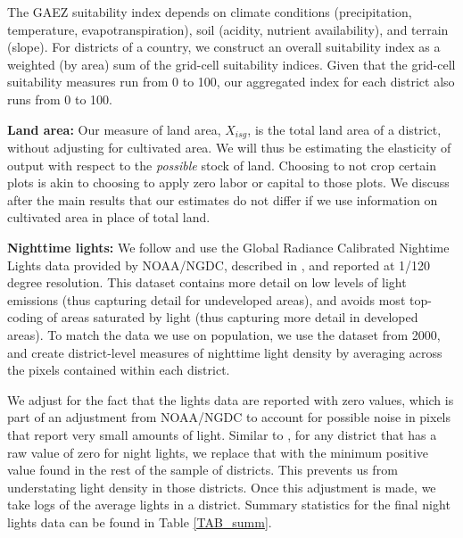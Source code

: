 \documentclass[11pt]{article}
\begin{document}
The GAEZ suitability index depends on climate conditions (precipitation, temperature, evapotranspiration), soil (acidity, nutrient availability), and terrain (slope). For districts of a country, we construct an overall suitability index as a weighted (by area) sum of the grid-cell suitability indices. Given that the grid-cell suitability measures run from 0 to 100, our aggregated index for each district also runs from 0 to 100.

\vspace{.5cm}\noindent\textbf{Land area:} Our measure of land area, $X_{isg}$, is the total land area of a district, without adjusting for cultivated area. We will thus be estimating the elasticity of output with respect to the \textit{possible} stock of land. Choosing to not crop certain plots is akin to choosing to apply zero labor or capital to those plots. We discuss after the main results that our estimates do not differ if we use information on cultivated area in place of total land.

\vspace{.5cm}\noindent\textbf{Nighttime lights:} We follow \citet{hssw2016} and use the Global Radiance Calibrated Nightime Lights data provided by NOAA/NGDC, described in \citet{Elvidge1999}, and reported at 1/120 degree resolution. This dataset contains more detail on low levels of light emissions (thus capturing detail for undeveloped areas), and avoids most top-coding of areas saturated by light (thus capturing more detail in developed areas). To match the data we use on population, we use the dataset from 2000, and create district-level measures of nighttime light density by averaging across the pixels contained within each district.

We adjust for the fact that the lights data are reported with zero values, which is part of an adjustment from NOAA/NGDC to account for possible noise in pixels that report very small amounts of light. Similar to \citet{hssw2016}, for any district that has a raw value of zero for night lights, we replace that with the minimum positive value found in the rest of the sample of districts. This prevents us from understating light density in those districts. Once this adjustment is made, we take logs of the average lights in a district. Summary statistics for the final night lights data can be found in Table \ref{TAB_summ}.
\end{document}

